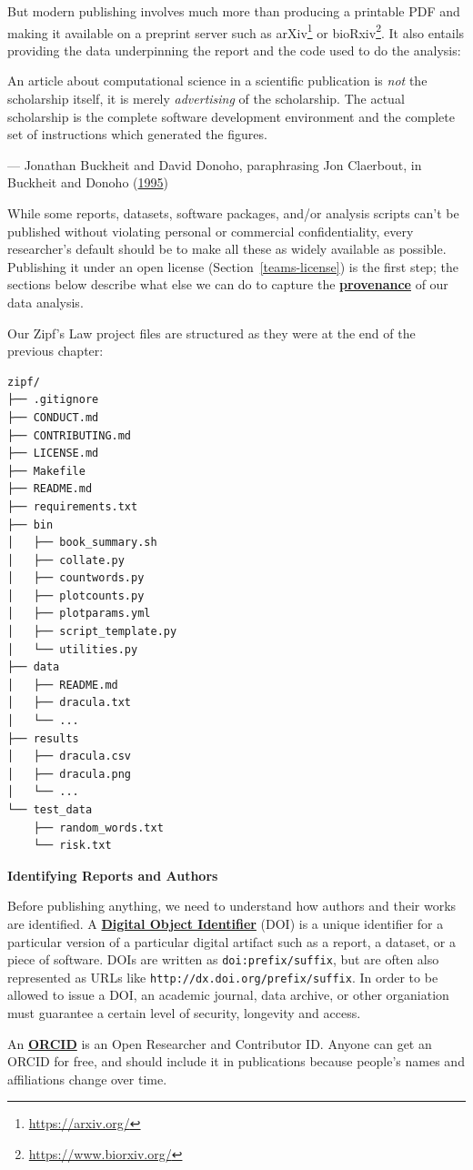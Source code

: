 \documentclass[
]{krantz}
\renewenvironment{quote}{\begin{VF}}{\end{VF}}
\renewcommand{\href}[2]{#2\footnote{\url{#1}}}
\newcommand{\gref}[2]{\hyperlink{#2}{\textbf{#1}}}
\begin{document}
But modern publishing involves much more than producing a printable PDF
and making it available on a preprint server such as \href{https://arxiv.org/}{arXiv} or \href{https://www.biorxiv.org/}{bioRxiv}.
It also entails providing the data underpinning the report
and the code used to do the analysis:

\begin{quote}
An article about computational science in a scientific publication
is \emph{not} the scholarship itself,
it is merely \emph{advertising} of the scholarship.
The actual scholarship is the complete software development environment
and the complete set of instructions which generated the figures.

--- Jonathan Buckheit and David Donoho, paraphrasing Jon Claerbout, in Buckheit and Donoho (\protect\hyperlink{ref-Buck1995}{1995})
\end{quote}

While some reports, datasets, software packages, and/or analysis scripts
can't be published without violating personal or commercial confidentiality,
every researcher's default should be to make all these as widely available as possible.
Publishing it under an open license (Section~\ref{teams-license}) is the first step;
the sections below describe what else we can do to capture
the \gref{provenance}{provenance} of our data analysis.

Our Zipf's Law project files are structured as they were at the end of the previous chapter:

\begin{verbatim}
zipf/
├── .gitignore
├── CONDUCT.md
├── CONTRIBUTING.md
├── LICENSE.md
├── Makefile
├── README.md
├── requirements.txt
├── bin
│   ├── book_summary.sh
│   ├── collate.py
│   ├── countwords.py
│   ├── plotcounts.py
│   ├── plotparams.yml
│   ├── script_template.py
│   └── utilities.py
├── data
│   ├── README.md
│   ├── dracula.txt
│   └── ...
├── results
│   ├── dracula.csv
│   ├── dracula.png
│   └── ...
└── test_data
    ├── random_words.txt
    └── risk.txt
\end{verbatim}

\begin{quote}
\textbf{Identifying Reports and Authors}

Before publishing anything,
we need to understand how authors and their works are identified.
A \gref{Digital Object Identifier}{doi} (DOI)
is a unique identifier for a particular version of a particular digital artifact
such as a report, a dataset, or a piece of software.
DOIs are written as \texttt{doi:prefix/suffix},
but are often also represented as URLs like \texttt{http://dx.doi.org/prefix/suffix}.
In order to be allowed to issue a DOI,
an academic journal, data archive, or other organiation
must guarantee a certain level of security, longevity and access.

An \gref{ORCID}{orcid}
is an Open Researcher and Contributor ID.
Anyone can get an ORCID for free,
and should include it in publications
because people's names and affiliations change over time.
\end{quote}
\end{document}
